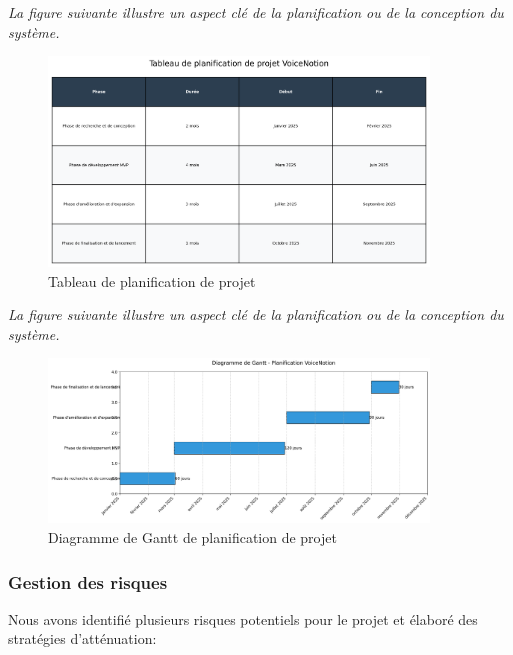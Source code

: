 \noindent
\textit{La figure suivante illustre un aspect clé de la planification ou de la conception du système.}
\begin{figure}[H]
    \centering
    \includegraphics[width=0.9\textwidth]{assets/docs/planification_table.png}
    \caption{Tableau de planification de projet}
    \label{fig:planification_table}
\end{figure}

\noindent
\textit{La figure suivante illustre un aspect clé de la planification ou de la conception du système.}
\begin{figure}[H]
    \centering
    \includegraphics[width=0.9\textwidth]{assets/docs/gantt_chart.png}
    \caption{Diagramme de Gantt de planification de projet}
    \label{fig:gantt_chart}
\end{figure}

\subsubsection{Gestion des risques}

Nous avons identifié plusieurs risques potentiels pour le projet et élaboré des stratégies d'atténuation:

